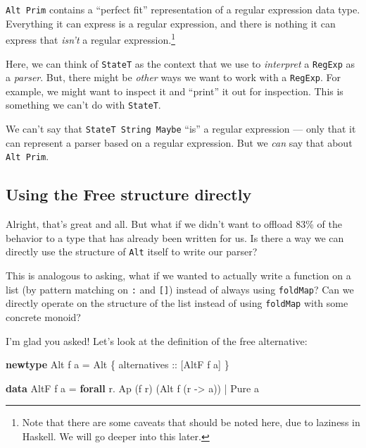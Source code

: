 \documentclass[]{article}
\newenvironment{Shaded}{}{}
\newcommand{\DataTypeTok}[1]{\textcolor[rgb]{0.56,0.13,0.00}{#1}}
\newcommand{\FunctionTok}[1]{\textcolor[rgb]{0.02,0.16,0.49}{#1}}
\newcommand{\KeywordTok}[1]{\textcolor[rgb]{0.00,0.44,0.13}{\textbf{#1}}}
\newcommand{\NormalTok}[1]{#1}
\newcommand{\OtherTok}[1]{\textcolor[rgb]{0.00,0.44,0.13}{#1}}
\begin{document}
\texttt{Alt\ Prim} contains a ``perfect fit'' representation of a regular
expression data type. Everything it can express is a regular expression, and
there is nothing it can express that \emph{isn't} a regular
expression.\footnote{Note that there are some caveats that should be noted here,
  due to laziness in Haskell. We will go deeper into this later.}

Here, we can think of \texttt{StateT} as the context that we use to
\emph{interpret} a \texttt{RegExp} as a \emph{parser}. But, there might be
\emph{other} ways we want to work with a \texttt{RegExp}. For example, we might
want to inspect it and ``print'' it out for inspection. This is something we
can't do with \texttt{StateT}.

We can't say that \texttt{StateT\ String\ Maybe} ``is'' a regular expression ---
only that it can represent a parser based on a regular expression. But we
\emph{can} say that about \texttt{Alt\ Prim}.

\hypertarget{using-the-free-structure-directly}{%
\subsection{Using the Free structure
directly}\label{using-the-free-structure-directly}}

Alright, that's great and all. But what if we didn't want to offload 83\% of the
behavior to a type that has already been written for us. Is there a way we can
directly use the structure of \texttt{Alt} itself to write our parser?

This is analogous to asking, what if we wanted to actually write a function on a
list (by pattern matching on \texttt{:} and \texttt{{[}{]}}) instead of always
using \texttt{foldMap}? Can we directly operate on the structure of the list
instead of using \texttt{foldMap} with some concrete monoid?

I'm glad you asked! Let's look at the definition of the free alternative:

\begin{Shaded}
\begin{Highlighting}[]
\KeywordTok{newtype} \DataTypeTok{Alt}\NormalTok{ f a }\FunctionTok{=} \DataTypeTok{Alt}\NormalTok{ \{}\OtherTok{ alternatives ::}\NormalTok{ [}\DataTypeTok{AltF}\NormalTok{ f a] \}}

\KeywordTok{data} \DataTypeTok{AltF}\NormalTok{ f a }\FunctionTok{=} \KeywordTok{forall}\NormalTok{ r}\FunctionTok{.} \DataTypeTok{Ap}\NormalTok{ (f r) (}\DataTypeTok{Alt}\NormalTok{ f (r }\OtherTok{->}\NormalTok{ a))}
              \FunctionTok{|}           \DataTypeTok{Pure}\NormalTok{ a}
\end{Highlighting}
\end{Shaded}
\end{document}
